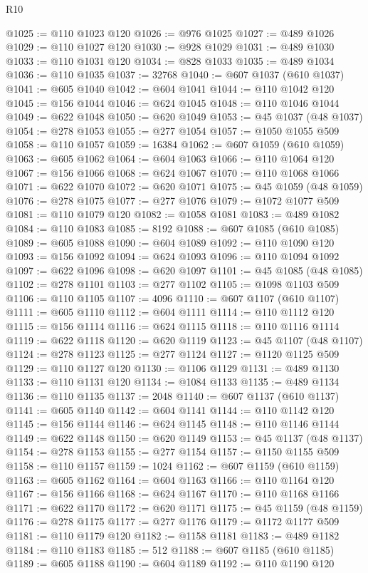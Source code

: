 \begin{lexlean}{R10}
\begin{coremodule}
@1025 := @110 @1023 @120
@1026 := @976 @1025
@1027 := @489 @1026
@1029 := @110 @1027 @120
@1030 := @928 @1029
@1031 := @489 @1030
@1033 := @110 @1031 @120
@1034 := @828 @1033
@1035 := @489 @1034
@1036 := @110 @1035
@1037 := 32768
@1040 := @607 @1037 (@610 @1037)
@1041 := @605 @1040
@1042 := @604 @1041
@1044 := @110 @1042 @120
@1045 := @156 @1044
@1046 := @624 @1045
@1048 := @110 @1046 @1044
@1049 := @622 @1048
@1050 := @620 @1049
@1053 := @45 @1037 (@48 @1037)
@1054 := @278 @1053
@1055 := @277 @1054
@1057 := @1050 @1055 @509
@1058 := @110 @1057
@1059 := 16384
@1062 := @607 @1059 (@610 @1059)
@1063 := @605 @1062
@1064 := @604 @1063
@1066 := @110 @1064 @120
@1067 := @156 @1066
@1068 := @624 @1067
@1070 := @110 @1068 @1066
@1071 := @622 @1070
@1072 := @620 @1071
@1075 := @45 @1059 (@48 @1059)
@1076 := @278 @1075
@1077 := @277 @1076
@1079 := @1072 @1077 @509
@1081 := @110 @1079 @120
@1082 := @1058 @1081
@1083 := @489 @1082
@1084 := @110 @1083
@1085 := 8192
@1088 := @607 @1085 (@610 @1085)
@1089 := @605 @1088
@1090 := @604 @1089
@1092 := @110 @1090 @120
@1093 := @156 @1092
@1094 := @624 @1093
@1096 := @110 @1094 @1092
@1097 := @622 @1096
@1098 := @620 @1097
@1101 := @45 @1085 (@48 @1085)
@1102 := @278 @1101
@1103 := @277 @1102
@1105 := @1098 @1103 @509
@1106 := @110 @1105
@1107 := 4096
@1110 := @607 @1107 (@610 @1107)
@1111 := @605 @1110
@1112 := @604 @1111
@1114 := @110 @1112 @120
@1115 := @156 @1114
@1116 := @624 @1115
@1118 := @110 @1116 @1114
@1119 := @622 @1118
@1120 := @620 @1119
@1123 := @45 @1107 (@48 @1107)
@1124 := @278 @1123
@1125 := @277 @1124
@1127 := @1120 @1125 @509
@1129 := @110 @1127 @120
@1130 := @1106 @1129
@1131 := @489 @1130
@1133 := @110 @1131 @120
@1134 := @1084 @1133
@1135 := @489 @1134
@1136 := @110 @1135
@1137 := 2048
@1140 := @607 @1137 (@610 @1137)
@1141 := @605 @1140
@1142 := @604 @1141
@1144 := @110 @1142 @120
@1145 := @156 @1144
@1146 := @624 @1145
@1148 := @110 @1146 @1144
@1149 := @622 @1148
@1150 := @620 @1149
@1153 := @45 @1137 (@48 @1137)
@1154 := @278 @1153
@1155 := @277 @1154
@1157 := @1150 @1155 @509
@1158 := @110 @1157
@1159 := 1024
@1162 := @607 @1159 (@610 @1159)
@1163 := @605 @1162
@1164 := @604 @1163
@1166 := @110 @1164 @120
@1167 := @156 @1166
@1168 := @624 @1167
@1170 := @110 @1168 @1166
@1171 := @622 @1170
@1172 := @620 @1171
@1175 := @45 @1159 (@48 @1159)
@1176 := @278 @1175
@1177 := @277 @1176
@1179 := @1172 @1177 @509
@1181 := @110 @1179 @120
@1182 := @1158 @1181
@1183 := @489 @1182
@1184 := @110 @1183
@1185 := 512
@1188 := @607 @1185 (@610 @1185)
@1189 := @605 @1188
@1190 := @604 @1189
@1192 := @110 @1190 @120

\end{coremodule}
\end{lexlean}
